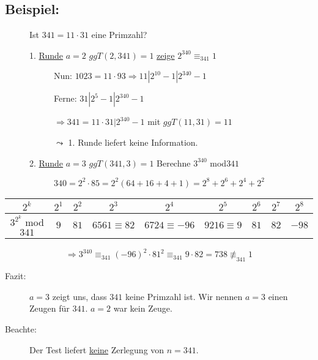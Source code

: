 \subsection{Beispiel:}
\begin{description}
	\item[] Ist $341 = 11 \cdot 31$ eine Primzahl?
	\item[] 1. \underline{Runde} $a = 2$ \quad $ggT(2,341) = 1$ \quad \underline{zeige} $2^{340} \equiv_{341} 1$
	\begin{description}
		\item[] Nun: $1023  = 11 \cdot 93 \Rightarrow 11|2^{10} - 1|2^{340} - 1$ 
		\item[] Ferne: $31|2^{5} - 1|2^{340} - 1$
		\item[] $\Rightarrow 341 = 11 \cdot 31 | 2^{340} - 1$ mit $ggT(11,31) = 11$
		\item[] $\leadsto$ 1. Runde liefert keine Information.
	\end{description}
	\item[] 2. \underline{Runde} $a = 3$ \quad $ggT(341,3) = 1$ \quad Berechne $3^{340}$ mod$341$ 
	\begin{description}
		\item[] $340 = 2^{2} \cdot 85 = 2^{2}(64+16+4+1) = 2^{8}+2^{6}+2^{4}+2^{2}$
	\end{description}
\end{description}

\begin{centering}
	\begin{tabular}{c|c|c|c|c|c|c|c|c} 
		$2^{k}$ & $2^{1}$ &  $2^{2}$ &  $2^{3}$ &  $2^{4}$ &  $2^{5}$ &  $2^{6}$ &  $2^{7}$ &  $2^{8}$  \\\hline 
		$3^{2^{k}}$ mod$341$ & $9$ & $81$ & $6561 \equiv 82$ & $6724 \equiv -96$ & $9216 \equiv 9$ & $81$ & $82$ & $-98$ \\
	\end{tabular}
\end{centering}
\begin{equation*}
	\Rightarrow 3^{340} \equiv_{341} (-96)^{2} \cdot 81^{2} \equiv_{341} 9 \cdot 82 = 738 \nequiv_{341} 1
\end{equation*}
\begin{description}
	\item[Fazit:] $a = 3$ zeigt uns, dass $341$ keine Primzahl ist. Wir nennen $a = 3$ einen Zeugen für $341$. $a = 2$ war kein Zeuge.
	\item[Beachte:] Der Test liefert \underline{keine} Zerlegung von $n = 341$.
\end{description}
%
%
%
